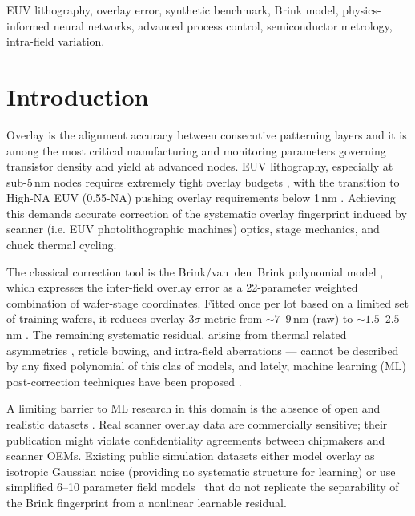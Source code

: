 \documentclass[10pt,conference]{IEEEtran}
\begin{document}
\begin{IEEEkeywords}
EUV lithography, overlay error, synthetic benchmark, Brink model,
physics-informed neural networks, advanced process control, semiconductor
metrology, intra-field variation.
\end{IEEEkeywords}

\section{Introduction}

Overlay is the alignment accuracy between consecutive patterning layers and it
is among the most critical manufacturing and monitoring parameters governing transistor density and yield
at advanced nodes.  EUV lithography, especially at sub-5\,nm nodes requires extremely tight overlay budgets
\cite{levinson2022, vanschoot2019}, with the transition to High-NA EUV (0.55-NA)
pushing overlay requirements below 1\,nm \cite{vanschoot2024}.  Achieving this demands
accurate correction of the systematic overlay fingerprint induced by scanner (i.e. EUV photolithographic machines)
optics, stage mechanics, and chuck thermal cycling.

The classical correction tool is the Brink/van~den~Brink polynomial model
\cite{brink1994, vandenBrink1996}, which expresses the inter-field overlay
error as a 22-parameter weighted combination of wafer-stage coordinates.
Fitted once per lot based on a limited set of training wafers, it reduces overlay
$3\sigma$ metric from $\sim\!7$–$9$\,nm (raw) to $\sim\!1.5$–$2.5$\,nm
\cite{phillips2020}.  The remaining systematic residual, arising from
thermal related asymmetries \cite{houlihan2007}, reticle bowing, and intra-field
aberrations \cite{magklaras2025, bornwolf1999} — cannot be described by any
fixed polynomial of this clas of models, and lately, machine learning (ML) post-correction techniques have been proposed
\cite{smith2018, abbe2019, kim2020, raissi2019}.

A limiting barrier to ML research in this domain is the absence of open and realistic
datasets \cite{pendyala2024}.  Real scanner overlay data are commercially sensitive; their
publication might violate confidentiality agreements between chipmakers and scanner
OEMs.  Existing public simulation datasets either model overlay as isotropic
Gaussian noise (providing no systematic structure for learning) \cite{magklaras2025} or use
simplified 6--10 parameter field models~\cite{smith2018,abbe2019,kim2020}
that do not replicate the separability of the Brink
fingerprint from a nonlinear learnable residual.
\end{document}
